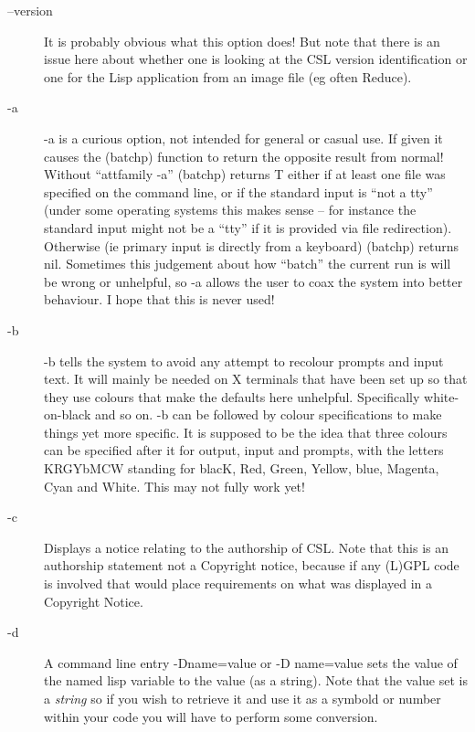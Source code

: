 \documentclass[a4paper,11pt]{article}
\begin{document}
\begin{description}
\item [{\ttfamily --version}] 
It is probably obvious what this option does! But note that there is an
issue here about whether one is looking at the CSL version identification or
one for the Lisp application from an image file (eg often Reduce).

\item [{\ttfamily -a}] 
{\ttfamily -a} is a curious option, not intended for general or casual use.
If given it causes the {\ttfamily (batchp)} function to return the opposite
result from normal!  Without ``{attfamily -a}'' {\ttfamily (batchp)} returns
{\ttfamily T} either if at least one file was specified on the command line,
or if the standard input is ``not a tty'' (under some operating systems this
makes sense -- for instance the standard input might not be a ``tty'' if it
is provided via file redirection).  Otherwise (ie primary input is directly
from a keyboard) {\ttfamily (batchp)} returns {\ttfamily nil}.  Sometimes
this judgement about how ``batch'' the current run is will be wrong or
unhelpful, so {\ttfamily -a} allows the user to coax the system into better
behaviour.  I hope that this is never used!

\item [{\ttfamily -b}] 
{\ttfamily -b} tells the system to avoid any attempt to recolour prompts
and input text. It will mainly be needed on X terminals that have been
set up so that they use colours that make the defaults here unhelpful.
Specifically white-on-black and so on.
{\ttfamily -b} can be followed by colour specifications to make things yet
more specific. It is supposed to be the idea that three colours can be
specified after it for output, input and prompts, with the letters KRGYbMCW
standing for blacK, Red, Green, Yellow, blue, Magenta, Cyan and White.
This may not fully work yet!

\item [{\ttfamily -c}] 
Displays a notice relating to the authorship of CSL. Note that this
is an authorship statement not a Copyright notice, because if any
(L)GPL code is involved that would place requirements on what was
displayed in a Copyright Notice.

\item [{\ttfamily -d}] 
A command line entry {\ttfamily -Dname=value} or {\ttfamily -D name=value}
sets the value of the named lisp variable to the value (as a string).
Note that the value set is a {\em string} so if you wish to retrieve
it and use it as a symbold or number within your code you will have to
perform some conversion.


\end{description}
\end{document}
